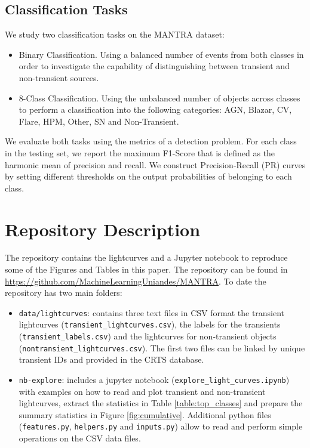 \documentclass[twocolumn]{aastex62}
\begin{document}
\subsection{Classification Tasks} \label{subsection_classification}
We study two classification tasks on the MANTRA dataset: 

\begin{itemize}
\item {Binary Classification}.
Using a balanced number of events from both classes in order 
to investigate the capability of distinguishing between transient
and non-transient sources.
\item{8-Class Classification}.
Using the unbalanced number of objects across classes to 
perform a classification into the following categories:
AGN, Blazar, CV, Flare, HPM, Other, SN and Non-Transient.
\end{itemize}

We evaluate both tasks using the metrics of a detection problem. 
For each class in the testing set, we report the maximum F1-Score 
that is defined as the harmonic mean of precision and recall. 
We construct Precision-Recall (PR) curves by setting different 
thresholds on the output probabilities of belonging to each class. 


\section{Repository Description} 
\label{sec:repository}

The repository contains the lightcurves and a Jupyter notebook
to reproduce some of the Figures and Tables in this paper.
The repository can be found in \url{https://github.com/MachineLearningUniandes/MANTRA}. 
To date the repository has two main folders:
\begin{itemize}

\item \texttt{data/lightcurves}: 
contains three text files in CSV format
the transient lightcurves (\texttt{transient\_lightcurves.csv}),
the labels for the transients (\texttt{transient\_labels.csv}) and
the lightcurves for non-transient objects
(\texttt{nontransient\_lightcurves.csv}). 
The first two files can be linked by unique transient IDs and
provided in the CRTS database. 
\item \texttt{nb-explore}: includes a jupyter notebook
  (\texttt{explore\_light\_curves.ipynb}) with examples on how to read
  and plot transient and non-transient lightcurves, extract the statistics in Table
  \ref{table:top_classes} and prepare the summary statistics in Figure
  \ref{fig:cumulative}. 
  Additional python files (\texttt{features.py},
  \texttt{helpers.py} and \texttt{inputs.py}) allow to read and perform
  simple operations on the CSV data files. 
\end{itemize}
\end{document}

